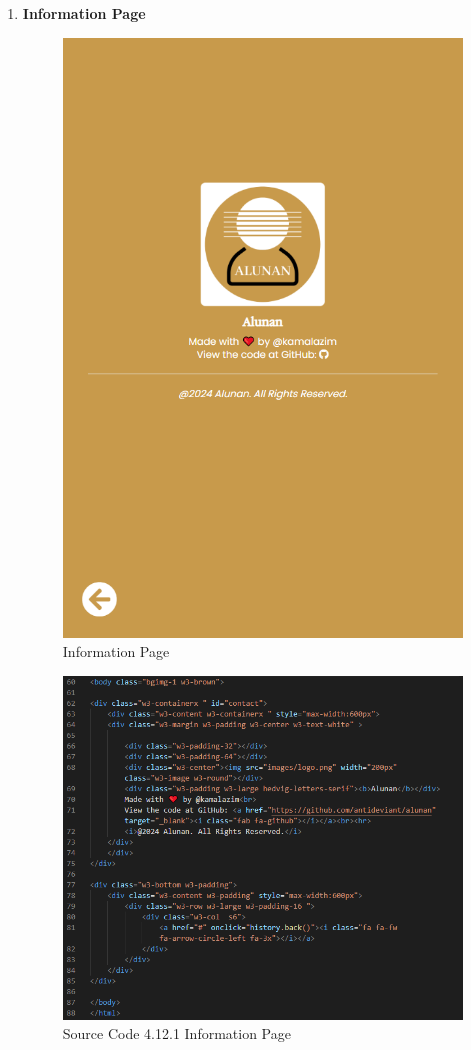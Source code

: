 \begin{enumerate}[1.]
    \item \textbf{Information Page}
    \begin{figure}[h]
        \centering
        \includegraphics[width=0.5\linewidth]{mainmatter/images/frontend/ss/Information Page.png}
        \caption{Information Page}
        \label{fig:myfig51}
    \end{figure}
    \begin{figure}[h]
        \centering
        \includegraphics[width=0.7\linewidth]{mainmatter/images/frontend/code/info.png}
        \caption*{Source Code 4.12.1 Information Page}
        \label{fig:myfig51a}
    \end{figure}


\end{enumerate}
